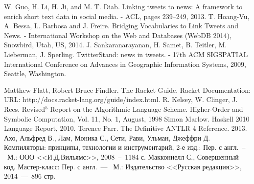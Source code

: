 \documentclass[12pt,a4paper,oneside]{extarticle}
\begin{document}
\begin{thebibliography}{0}
     W. Guo, H. Li, H. Ji, and M. T. Diab. Linking tweets to news: A framework to enrich short text data in social media. - ACL, pages 239–249, 2013.
     T. Hoang-Vu, A. Bessa, L. Barbosa and J. Freire. Bridging Vocabularies to Link Tweets and News. - International Workshop on the Web and Databases (WebDB 2014), Snowbird, Utah, US, 2014.
     J. Sankaranarayanan, H. Samet, B. Teitler, M. Lieberman, J. Sperling. TwitterStand: news in tweets. - 17th ACM SIGSPATIAL International Conference on Advances in Geographic Information Systems, 2009, Seattle, Washington.


     Matthew Flatt, Robert Bruce Findler. The Racket Guide. Racket Documentation: URL: http://docs.racket-lang.org/guide/index.html.
     R. Kelsey, W. Clinger, J. Rees. Revised$^5$ Report on the Algorithmic Language Scheme. Higher-Order and Symbolic Computation, Vol. 11, No. 1, August, 1998
     Simon Marlow. Haskell 2010 Language Report, 2010.
     Terence Parr. The Definitive ANTLR 4 Reference. 2013.
     Ахо, Альфред В., Лам, Моника С., Сети, Рави, Ульман, Джеффри Д. Компиляторы: принципы, технологии и инструментарий, 2-е изд.: Пер. с англ.~--~М.: ООО <<И.Д.Вильямс>>, 2008~--~1184 с.
     Макконнелл С., Совершенный код. Мастер-класс: Пер. с англ.~---~ М.: Издательство <<Русская редакция>>, 2014~---~896 стр.        
\end{thebibliography}
\end{document}
